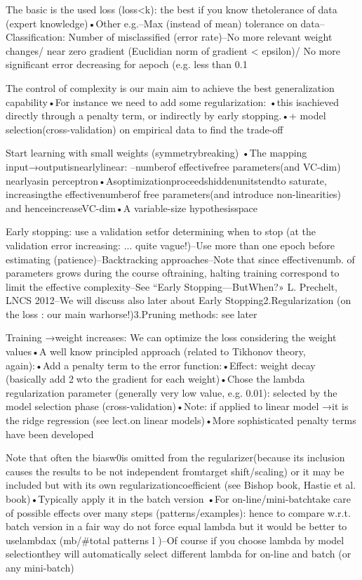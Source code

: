 The basic is the used loss (loss<k): the best if you know thetolerance of data (expert knowledge)•Other e.g.–Max (instead of mean) tolerance on data–Classification: Number of misclassified (error rate)–No more relevant weight changes/ near zero gradient (Euclidian norm of gradient < epsilon)/ No more significant error decreasing for aepoch (e.g. less than 0.1%

The control of complexity  is our main aim to achieve the best generalization capability•For instance  we need to add some regularization: •this isachieved directly through a penalty term, or indirectly by early stopping.•+ model selection(cross-validation) on empirical data to find the trade-off

Start learning with small weights (symmetrybreaking) •The mapping input→outputisnearlylinear: –numberof effectivefree parameters(and VC-dim) nearlyasin perceptron•Asoptimizationproceedshiddenunitstendto saturate, increasingthe effectivenumberof free parameters(and introduce non-linearities) and henceincreaseVC-dim•A variable-size hypothesisspace

Early stopping: use a validation setfor determining when to stop (at the validation error increasing: ... quite vague!)–Use more than one epoch before estimating (patience)–Backtracking approaches–Note that since effectivenumb. of parameters  grows during the course oftraining, halting training correspond to limit the effective complexity–See “Early Stopping—ButWhen?» L. Prechelt,  LNCS 2012–We will discuss also later about Early Stopping2.Regularization (on the loss : our main warhorse!)3.Pruning methods: see later

Training →weight increases: We can  optimize the loss considering the weight values•A well know principled approach (related to Tikhonov theory, again):•Add a penalty term to the error function:•Effect: weight decay (basically add 2wto the gradient for each weight)•Chose the lambda regularization  parameter (generally very low value, e.g. 0.01):  selected by the model selection phase (cross-validation)•Note: if applied to linear model →it is the ridge regression (see lect.on linear models)•More sophisticated penalty terms have been developed

Note that often the biasw0is omitted from the regularizer(because its inclusion  causes the results to be not independent fromtarget shift/scaling) or it may be included but with its own regularizationcoefficient (see Bishop book, Hastie et al. book)•Typically apply it  in the batch version •For on-line/mini-batchtake care of possible effects over many steps (patterns/examples): hence to compare w.r.t. batch version in a fair way do not force equal lambda but it would be better to uselambdax (mb/#total patterns l )–Of course if you choose lambda by model selectionthey will  automatically select different lambda for on-line and batch (or any mini-batch)

